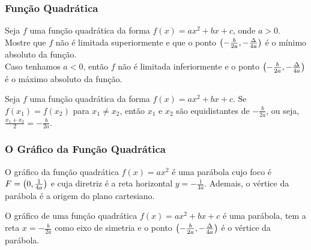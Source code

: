 \documentclass[brazil, notheorems, 10pt]{beamer}
\begin{document}
\begin{frame}
\frametitle{Função Quadrática} %

\begin{Prop}
Seja $f$ uma função quadrática da forma $f(x) = ax^2 + bx +c$, onde
$a >0$.\\
Mostre que $f$ não é limitada superiormente e que o ponto
$\left(-\frac {b} {2a}, -\frac {\Delta} {4a}\right)$ é o mínimo absoluto
da função.\\
Caso tenhamos $a<0$, então $f$ não é limitada inferiormente e  o
ponto $\left(-\frac {b} {2a}, -\frac {\Delta} {4a}\right)$ é o máximo
absoluto da função.
\end{Prop}\pause

\begin{Prop}
Seja $f$ uma função quadrática da forma $f(x) = ax^2 + bx +c$. Se
$f(x_1) = f(x_2)$ para $x_1 \neq x_2$, então $x_1$ e $x_2$ são
equidistantes de $-\frac{b} {2a}$, ou seja, $\frac{x_1 +x_2} 2 =
-\frac{b}{2a}$.
\end{Prop}

\end{frame}


\begin{frame}
\frametitle{O Gráfico da Função Quadrática} %

\begin{Exem}
O gráfico da função quadrática $f(x) = ax^2$ é uma parábola cujo
foco é $F = \left(0, \frac 1 {4a}\right)$ e cuja diretriz é a reta
horizontal $y = -\frac{1}{4a}$. Ademais, o vértice da parábola é a
origem do plano cartesiano.
\end{Exem}\pause

\begin{Prop}
O gráfico de uma função quadrática $f(x) = ax^2 + bx + c$ é uma
parábola, tem a reta $x = -\frac {b}{2a}$ como eixo de simetria e o
ponto $\left(-\frac {b} {2a}, -\frac {\Delta} {4a}\right)$ é o vértice da
parábola.
\end{Prop}

\end{frame}

\end{document}
